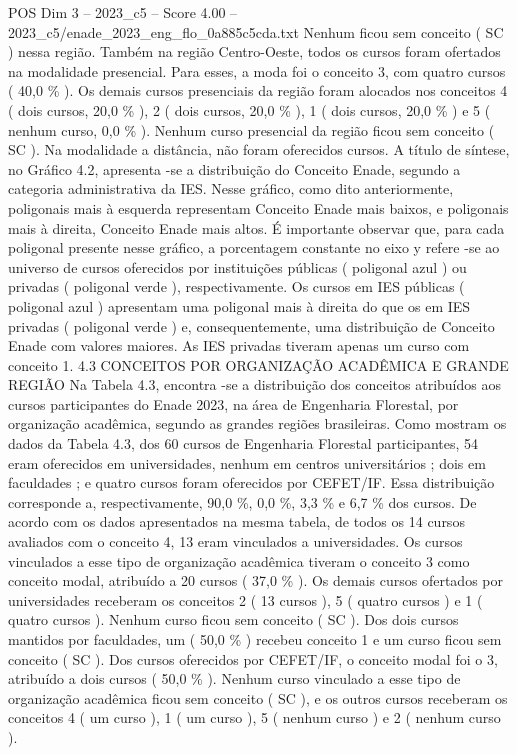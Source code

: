 \begin{textsample}{POS Dim 3 – 2023\_c5 – Score 4.00 – 2023\_c5/enade\_2023\_eng\_flo\_0a885c5cda.txt}
Nenhum ficou sem conceito ( SC ) nessa região.
Também na região Centro-Oeste, todos os cursos foram ofertados na modalidade presencial.
Para esses, a moda foi o conceito 3, com quatro cursos ( 40,0 \% ).
Os demais cursos presenciais da região foram alocados nos conceitos 4 ( dois cursos, 20,0 \% ), 2 ( dois cursos, 20,0 \% ), 1 ( dois cursos, 20,0 \% ) e 5 ( nenhum curso, 0,0 \% ).
Nenhum curso presencial da região ficou sem conceito ( SC ).
Na modalidade a distância, não foram oferecidos cursos.
A título de síntese, no Gráfico 4.2, apresenta -se a distribuição do Conceito Enade, segundo a categoria administrativa da IES.
Nesse gráfico, como dito anteriormente, poligonais mais à esquerda representam Conceito Enade mais baixos, e poligonais mais à direita, Conceito Enade mais altos.
É importante observar que, para cada poligonal presente nesse gráfico, a porcentagem constante no eixo y refere -se ao universo de cursos oferecidos por instituições públicas ( poligonal azul ) ou privadas ( poligonal verde ), respectivamente.
Os cursos em IES públicas ( poligonal azul ) apresentam uma poligonal mais à direita do que os em IES privadas ( poligonal verde ) e, consequentemente, uma distribuição de Conceito Enade com valores maiores.
As IES privadas tiveram apenas um curso com conceito 1. 4.3 CONCEITOS POR ORGANIZAÇÃO ACADÊMICA E GRANDE REGIÃO Na Tabela 4.3, encontra -se a distribuição dos conceitos atribuídos aos cursos participantes do Enade 2023, na área de Engenharia Florestal, por organização acadêmica, segundo as grandes regiões brasileiras.
Como mostram os dados da Tabela 4.3, dos 60 cursos de Engenharia Florestal participantes, 54 eram oferecidos em universidades, nenhum em centros universitários ; dois em faculdades ; e quatro cursos foram oferecidos por CEFET/IF.
Essa distribuição corresponde a, respectivamente, 90,0 \%, 0,0 \%, 3,3 \% e 6,7 \% dos cursos.
De acordo com os dados apresentados na mesma tabela, de todos os 14 cursos avaliados com o conceito 4, 13 eram vinculados a universidades.
Os cursos vinculados a esse tipo de organização acadêmica tiveram o conceito 3 como conceito modal, atribuído a 20 cursos ( 37,0 \% ).
Os demais cursos ofertados por universidades receberam os conceitos 2 ( 13 cursos ), 5 ( quatro cursos ) e 1 ( quatro cursos ).
Nenhum curso ficou sem conceito ( SC ).
Dos dois cursos mantidos por faculdades, um ( 50,0 \% ) recebeu conceito 1 e um curso ficou sem conceito ( SC ).
Dos cursos oferecidos por CEFET/IF, o conceito modal foi o 3, atribuído a dois cursos ( 50,0 \% ).
Nenhum curso vinculado a esse tipo de organização acadêmica ficou sem conceito ( SC ), e os outros cursos receberam os conceitos 4 ( um curso ), 1 ( um curso ), 5 ( nenhum curso ) e 2 ( nenhum curso ).

\end{textsample}
